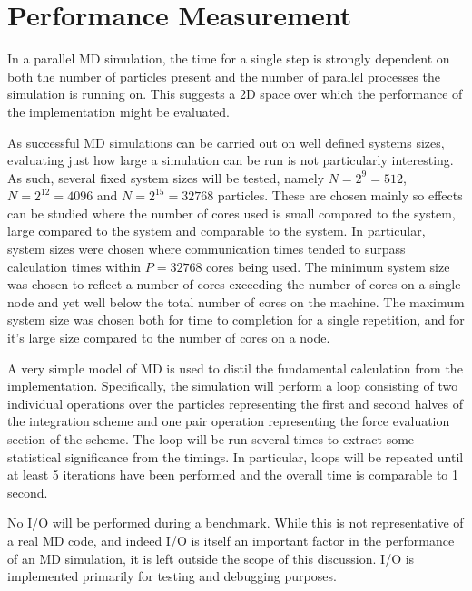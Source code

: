


\section{Performance Measurement}

%
In a parallel MD simulation, the time for a single step is strongly dependent
on both the number of particles present and
the number of parallel processes the simulation is running on.
%
This suggests a 2D space over which the performance of the implementation
might be evaluated.

%
As successful MD simulations can be carried out on well defined
systems sizes, evaluating just how large a simulation can be run
is not particularly interesting.
%
As such, several fixed system sizes will be tested, namely
$N = 2^{9} = 512$,
$N = 2^{12} = 4096$ and
$N = 2^{15} = 32768$
particles.
%
These are chosen mainly so effects can be studied where the number of cores
used is small compared to the system, large compared to the system
and comparable to the system.
%
In particular, system sizes were chosen where communication times
tended to surpass calculation times within $P = 32768$ cores
being used.
%
The minimum system size was chosen to reflect a number of cores
exceeding the number of cores on a single \hector{} node and yet well
below the total number of cores on the machine.
%
The maximum system size was chosen both for time to completion for
a single repetition, and for it's large size compared to the number of
cores on a \hector{} node.

%
A very simple model of MD is used to distil the fundamental calculation
from the implementation.
%
Specifically, the simulation will perform a loop consisting of two
individual operations over the particles representing the first
and second halves of the \velocityverlet{} integration scheme and one
pair operation representing the force evaluation section of the scheme.
%
The loop will be run several times to extract some statistical significance
from the timings.
%
In particular, loops will be repeated until at least 5 iterations
have been performed and the overall time is comparable to 1 second.

%
No I/O will be performed during a benchmark.
%
While this is not representative of a real MD code, and indeed I/O
is itself an important factor in the performance of an MD simulation,
it is left outside the scope of this discussion.
%
I/O is implemented primarily for testing and debugging purposes.

